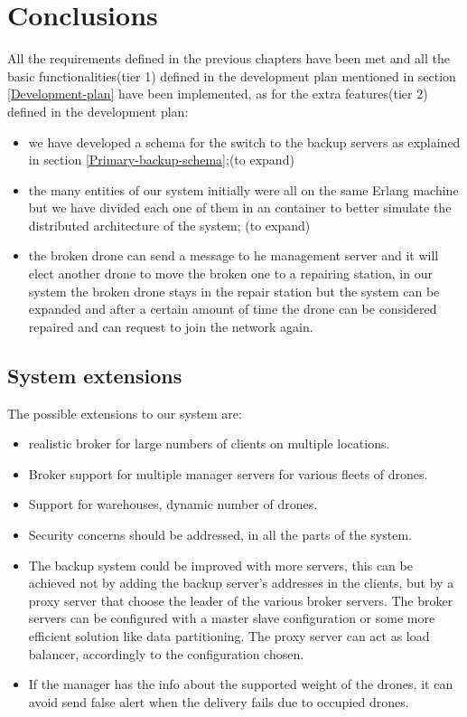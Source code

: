 \documentclass[a4paper, oneside]{memoir}
\begin{document}
\chapter{Conclusions}
All the requirements defined in the previous chapters have been met and all the basic functionalities(tier 1) defined in the development plan mentioned in section \ref{Development-plan} have been implemented, as for the extra features(tier 2) defined in the development plan:
\begin{itemize}
\item we have developed a schema for the switch to the backup servers as explained in section \ref{Primary-backup-schema};(to expand)
\item the many entities of our system initially were all on the same Erlang machine but we have divided each one of them in an container to better simulate the distributed architecture of the system; (to expand)
\item the broken drone can send a message to he management server and it will elect another drone to move the broken one to a repairing station, in our system the broken drone stays in the repair station but the system can be expanded and after a certain amount of time the drone can be considered repaired and can request to join the network again.
\end{itemize}

\section{System extensions}
The possible extensions to our system are:
\begin{itemize}
	\item realistic broker for large numbers of clients on multiple locations.
	\item Broker support for multiple manager servers for various fleets of drones.
	\item Support for warehouses, dynamic number of drones.
	\item Security concerns should be addressed, in all the parts of the system.
	\item The backup system could be improved with more servers, this can be achieved not by adding the backup server's addresses in the clients, but by a proxy server that choose the leader of the various broker servers. The broker servers can be configured with a master slave configuration or some more efficient solution like data partitioning. The proxy server can act as load balancer, accordingly to the configuration chosen.
	\item If the manager has the info about the supported weight of the drones, it can avoid send false alert when the delivery fails due to occupied drones.
\end{itemize}
\end{document}
